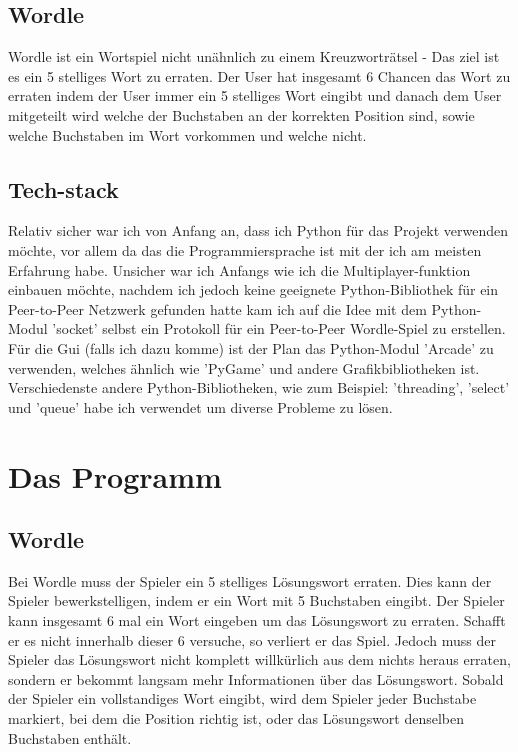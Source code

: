 \documentclass[a4paper]{article}
\begin{document}
        
        \subsection{Wordle}
        Wordle ist ein Wortspiel nicht unähnlich zu einem Kreuzworträtsel - Das ziel ist es ein 5 stelliges Wort zu erraten.
        Der User hat insgesamt 6 Chancen das Wort zu erraten indem der User immer ein 5 stelliges Wort eingibt und danach dem User mitgeteilt wird welche der Buchstaben an der korrekten Position sind, sowie welche Buchstaben im Wort vorkommen und welche nicht.
        
        \subsection{Tech-stack}
        Relativ sicher war ich von Anfang an, dass ich Python für das Projekt verwenden möchte, vor allem da das die Programmiersprache ist mit der ich am meisten Erfahrung habe.
        Unsicher war ich Anfangs wie ich die Multiplayer-funktion einbauen möchte, nachdem ich jedoch keine geeignete Python-Bibliothek für ein Peer-to-Peer Netzwerk gefunden hatte kam ich auf die Idee mit dem Python-Modul 'socket' selbst ein Protokoll für ein Peer-to-Peer Wordle-Spiel zu erstellen.
        Für die Gui (falls ich dazu komme) ist der Plan das Python-Modul 'Arcade' zu verwenden, welches ähnlich wie 'PyGame' und andere Grafikbibliotheken ist.
        Verschiedenste andere Python-Bibliotheken, wie zum Beispiel: 'threading', 'select' und 'queue' habe ich verwendet um diverse Probleme zu lösen.
        
    
    \section{Das Programm}
        \subsection{Wordle}
            Bei Wordle muss der Spieler ein 5 stelliges Lösungswort erraten. Dies kann der Spieler bewerkstelligen, indem er ein Wort mit 5 Buchstaben eingibt.
            Der Spieler kann insgesamt 6 mal ein Wort eingeben um das Lösungswort zu erraten. Schafft er es nicht innerhalb dieser 6 versuche, so verliert er das Spiel. 
            Jedoch muss der Spieler das Lösungswort nicht komplett willkürlich aus dem nichts heraus erraten, sondern er bekommt langsam mehr Informationen über das Lösungswort. Sobald der Spieler ein vollstandiges Wort eingibt, wird dem Spieler jeder Buchstabe markiert, bei dem  die Position richtig ist, oder das Lösungswort denselben Buchstaben enthält.
            
\end{document}
